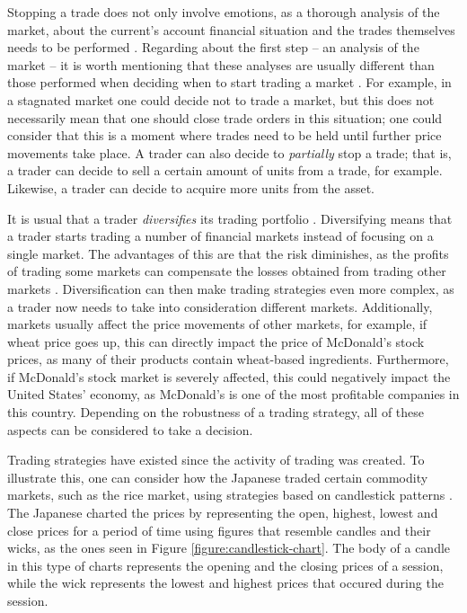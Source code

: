 Stopping a trade does not only involve emotions, as a thorough analysis of the
market, about the current's account financial situation and the trades
themselves needs to be performed \cite{Kadiri2015}. Regarding about the first
step -- an analysis of the market -- it is worth mentioning that these analyses
are usually different than those performed when deciding when to start trading a
market \cite{Conrad1998} \cite{Muller1997}. For example, in a stagnated market
one could decide not to trade a market, but this does not necessarily mean that
one should close trade orders in this situation; one could consider that this is
a moment where trades need to be held until further price movements take
place. A trader can also decide to \textit{partially} stop a trade; that is, a
trader can decide to sell a certain amount of units from a trade, for
example. Likewise, a trader can decide to acquire more units from the asset.

It is usual that a trader \textit{diversifies} its trading portfolio
\cite{Muller1997}. Diversifying means that a trader starts trading a number of
financial markets instead of focusing on a single market. The advantages of this
are that the risk diminishes, as the profits of trading some markets can
compensate the losses obtained from trading other markets
\cite{Muller1997}. Diversification can then make trading strategies even more
complex, as a trader now needs to take into consideration different
markets. Additionally, markets usually affect the price movements of other
markets, for example, if wheat price goes up, this can directly impact the price
of McDonald's stock prices, as many of their products contain wheat-based
ingredients. Furthermore, if McDonald's stock market is severely affected, this
could negatively impact the United States' economy, as McDonald's is one of the
most profitable companies in this country. Depending on the robustness of a
trading strategy, all of these aspects can be considered to take a decision.

Trading strategies have existed since the activity of trading was created.  To
illustrate this, one can consider how the Japanese traded certain commodity
markets, such as the rice market, using strategies based on candlestick patterns
\cite{Nison1991}. The Japanese charted the prices by representing the open,
highest, lowest and close prices for a period of time using figures that
resemble candles and their wicks, as the ones seen in Figure
\ref{figure:candlestick-chart}. The body of a candle in this type of charts
represents the opening and the closing prices of a session, while the wick
represents the lowest and highest prices that occured during the session.


